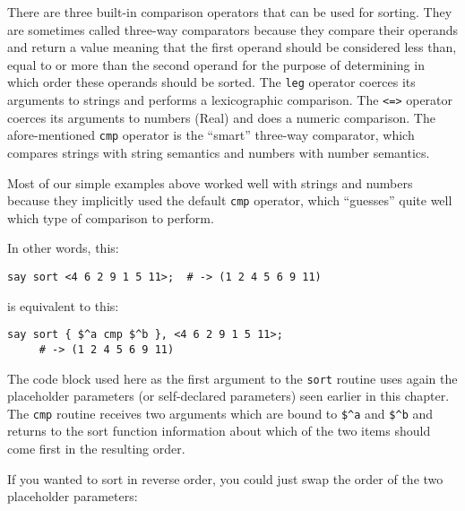 There are three built-in comparison operators that can be used 
for sorting. They are sometimes called three-way comparators 
because they compare their operands and return a value meaning 
that the first operand should be considered less than, equal to 
or more than the second operand for the purpose of determining 
in which order these operands should be sorted. The {\tt leg} 
operator coerces its arguments to strings and performs a 
lexicographic comparison. The \verb'<=>' operator coerces 
its arguments to numbers (Real) and does a numeric comparison. 
The afore-mentioned {\tt cmp} operator is the ``smart'' 
three-way comparator, which compares strings with string 
semantics and numbers with number semantics.

Most of our simple examples above worked well with 
strings and numbers because they implicitly used the 
default {\tt cmp} operator, which ``guesses'' quite 
well which type of comparison to perform.

\ifplastex \else
{}
\fi



In other words, this:

\begin{verbatim}
say sort <4 6 2 9 1 5 11>;  # -> (1 2 4 5 6 9 11)
\end{verbatim}

is equivalent to this:

\begin{verbatim}
say sort { $^a cmp $^b }, <4 6 2 9 1 5 11>;
     # -> (1 2 4 5 6 9 11)
\end{verbatim}

The code block used here as the first argument to the 
{\tt sort} routine uses again the placeholder 
parameters (or self-declared parameters) seen earlier 
in this chapter. The {\tt cmp} routine receives two 
arguments which are bound to \verb'$^a' and \verb'$^b' 
and returns to the sort function information about which 
of the two items should come first in the resulting order.

If you wanted to sort in reverse order, you could just 
swap the order of the two placeholder parameters:

